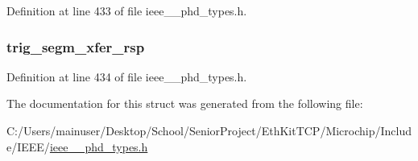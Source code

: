 Definition at line 433 of file ieee\+\_\+\_\+phd\+\_\+types.\+h.

\hypertarget{struct___trig_segm_data_xfer_rsp_ab48acc575126d5f1ae707e2dca4488b1}{}
\subsubsection[{trig\+\_\+segm\+\_\+xfer\+\_\+rsp}]{ trig\+\_\+segm\+\_\+xfer\+\_\+rsp}\label{struct___trig_segm_data_xfer_rsp_ab48acc575126d5f1ae707e2dca4488b1}


Definition at line 434 of file ieee\+\_\+\_\+phd\+\_\+types.\+h.



The documentation for this struct was generated from the following file\+:\begin{DoxyCompactItemize}
\item 
C\+:/\+Users/mainuser/\+Desktop/\+School/\+Senior\+Project/\+Eth\+Kit\+T\+C\+P/\+Microchip/\+Include/\+I\+E\+E\+E/\hyperlink{ieee__11073__phd__types_8h}{ieee\+\_\+\_\+phd\+\_\+types.\+h}\end{DoxyCompactItemize}
